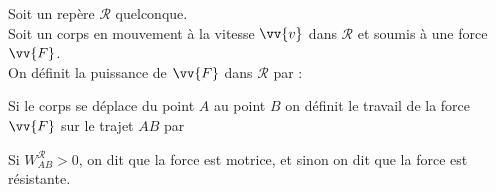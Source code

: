 ﻿\documentclass[a4paper]{article}
\begin{document}
\pagestyle{fancy}
\fancyhf{}
\setlength{\headheight}{15pt}

\begin{center}
	\large{}
\end{center}


Soit un repère \(\mathcal{R}\) quelconque.\\
Soit un corps en mouvement à la vitesse \(\vv{v}\) dans \(\mathcal{R}\) et soumis à une force \(\vv{F}\).\\
On définit la puissance de \(\vv{F}\) dans \(\mathcal{R}\) par :\begin{center}\end{center}
Si le corps se déplace du point \(A\) au point \(B\) on définit le travail de la force \(\vv{F}\) sur le trajet \(AB\) par \begin{center}\end{center}
Si \(W_{AB}^{\mathcal{R}}>0\), on dit que la force est motrice, et sinon on dit que la force est résistante.
\end{document}
